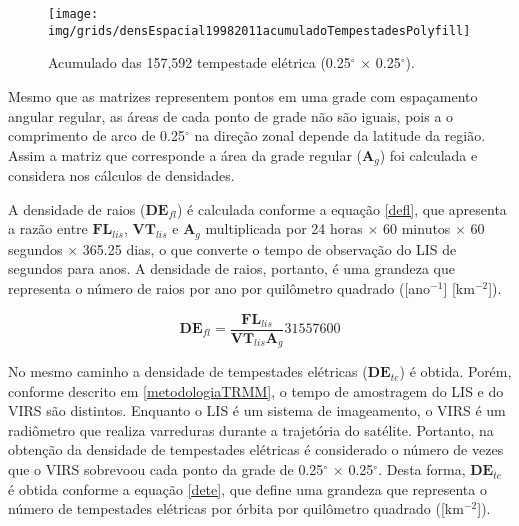 \begin{figure}[!ht]
  \centering 
  {{\texttt{[image: img/grids/densEspacial19982011acumuladoTempestadesPolyfill]}}}
\caption{Acumulado das 157,592 tempestade elétrica (0.25$^{\circ}$  $\times$ 0.25$^{\circ}$).}
\label{taxaTotalTe}
\end{figure} 

Mesmo que as matrizes representem pontos em uma grade com espaçamento angular regular, as áreas de cada ponto de grade não são iguais, pois a  o comprimento de arco de 0.25$^{\circ}$ na direção zonal depende da latitude da região. Assim a matriz que corresponde a área da grade regular ($\mathbf{A}_g$) foi calculada e considera nos cálculos de densidades.


A densidade de raios ($\mathbf{DE}_{fl}$) é calculada conforme a equação \ref{defl}, que apresenta a razão entre $\mathbf{FL}_{lis}$, $\mathbf{VT}_{lis}$ e $\mathbf{A}_g$ multiplicada por 24 horas $\times$ 60 minutos $\times$ 60 segundos $\times$ 365.25 dias, o que converte o tempo de observação do LIS de segundos para anos. A densidade de raios, portanto, é uma grandeza que representa o número de raios por ano por quilômetro quadrado ([ano$^{-1}$] [km$^{-2}$]).

\begin{equation}
\mathbf{DE}_{fl} = \frac{\mathbf{FL}_{lis}}{\mathbf{VT}_{lis} \mathbf{A}_g} 31557600     
\label{defl}
\end{equation}

No mesmo caminho a densidade de tempestades elétricas ($\mathbf{DE}_{te}$) é obtida. Porém, conforme descrito em \ref{metodologiaTRMM}, o tempo de amostragem do LIS e do VIRS são distintos. Enquanto o LIS é um sistema de imageamento, o VIRS é um radiômetro que realiza varreduras durante a trajetória do satélite. Portanto, na obtenção da densidade de tempestades elétricas é considerado o número de vezes que o VIRS sobrevoou cada ponto da grade de 0.25$^{\circ}$  $\times$ 0.25$^{\circ}$. Desta forma, $\mathbf{DE}_{te}$ é obtida conforme a equação \ref{dete}, que define uma grandeza que representa o número de tempestades elétricas por órbita por quilômetro quadrado ([km$^{-2}$]).

